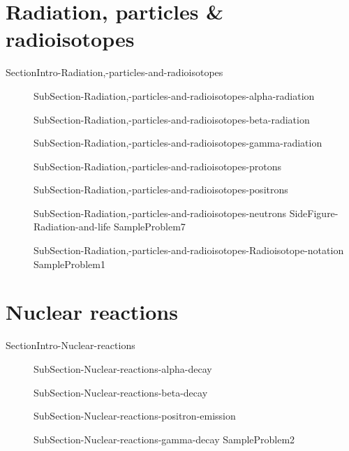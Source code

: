 \documentclass[main.tex]{subfiles}
\newcommand\chapterlabel{Ch-nuclear}\setcounter{figurenewcounter}{0}\setcounter{tablenewcounter}{0}\setcounter{formulanewcounter}{0}\chapterpicture{../{\chapterlabel}/figure1}\chapterpicturelabel{PxFuel}
\begin{document}
\section{Radiation, particles \& radioisotopes}{SectionIntro-Radiation,-particles-and-radioisotopes}
\sloppy \begin{description}
\item[] {SubSection-Radiation,-particles-and-radioisotopes-alpha-radiation}
\item[] {SubSection-Radiation,-particles-and-radioisotopes-beta-radiation}
\item[] {SubSection-Radiation,-particles-and-radioisotopes-gamma-radiation}
\item[] {SubSection-Radiation,-particles-and-radioisotopes-protons}
\item[] {SubSection-Radiation,-particles-and-radioisotopes-positrons}
\item[] {SubSection-Radiation,-particles-and-radioisotopes-neutrons}
{SideFigure-Radiation-and-life}
  {SampleProblem7}
\item[]  {SubSection-Radiation,-particles-and-radioisotopes-Radioisotope-notation}
  {SampleProblem1}
\end{description}
\newpage\vspace{10cm}{Table-Nuclear-symbols}

 
 
 
 
 

\section{Nuclear reactions}{SectionIntro-Nuclear-reactions}
\sloppy \begin{description}
\item[] {SubSection-Nuclear-reactions-alpha-decay}
\item[] {SubSection-Nuclear-reactions-beta-decay}
\item[] {SubSection-Nuclear-reactions-positron-emission}
\item[] {SubSection-Nuclear-reactions-gamma-decay}
  {SampleProblem2}
\end{description}
\end{document}
